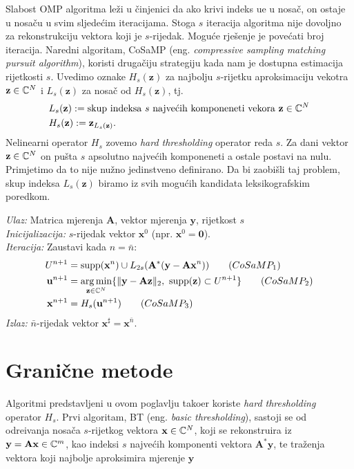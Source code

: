 \documentclass[a4paper,twoside,12pt]{memoir} %
\newcommand{\vect}[1]{\mathbf{#1}}
\renewcommand{\vec}{\vect}
\newcommand{\supp}{\text{\normalfont{supp}}}
\newcommand{\norm}[1]{\|{#1}\|}
\DeclareMathOperator*{\argmin}{arg\,min}
\newenvironment{alg}[1]
{
    \bigskip
    \begin{tcolorbox}[arc=0mm,boxrule=1.2pt,colframe=black,colback=white,detach title, before upper={\medskip\begin{center}\textbf{#1}\end{center}\hline\newline\medskip},frame hidden]
    \medskip
}
{
    \medskip
\end{tcolorbox}
    \bigskip
}
\begin{document}
\indent
Slabost OMP algoritma le\v{z}i u \v{c}injenici da ako krivi indeks u\dj e u nosa\v{c}, on ostaje u nosa\v{c}u u svim sljede\'cim iteracijama. Stoga $s$ iteracija algoritma nije dovoljno za rekonstrukciju vektora koji je $s$-rijedak. Mogu\'ce rje\v{s}enje je pove\'cati broj iteracija. Naredni algoritam, CoSaMP (eng. \textit{compressive sampling matching pursuit algorithm}), koristi druga\v{c}iju strategiju kada nam je dostupna estimacija rijetkosti $s$. Uvedimo oznake $H_s(\vec z)$ za najbolju $s$-rijetku aproksimaciju vekotra $\vec z \in \C^N$ i $L_s(\vec z)$ za nosa\v{c} od $H_s(\vec z)$, tj.
\begin{align}
    &L_s(\vec z) := \text{skup indeksa $s$ najve\'cih komponeneti vekora } \vec z \in \C^N \\
    &H_s(\vec z) := \vec z_{L_s(\vec z)}.
\end{align}
Nelinearni operator $H_s$ zovemo \textit{hard thresholding} operator reda $s$. Za dani vektor $\vec z \in \C^N$ on pu\v{s}ta $s$ apsolutno najve\'cih komponeneti a ostale postavi na nulu. Primjetimo da to nije nu\v{z}no jedinstveno definirano. Da bi zaobi\v{s}li taj problem, skup indeksa $L_s(\vec z)$ biramo iz svih mogu\'cih kandidata leksikografskim poredkom.

\begin{alg}{CoSaMP}
    \textit{Ulaz:} Matrica mjerenja $\vec A$, vektor mjerenja $\vec y$, rijetkost $s$ \\
    \textit{Inicijalizacija:} $s$-rijedak vektor $\vec x^0$ (npr. $\vec x^0 = \vec 0$).\\
    \textit{Iteracija:} Zaustavi kada $n = \bar{n}$:
        \begin{align*}
            U^{n+1} & = \supp(\vec x^n)\cup L_{2s}(\vec A^*(\vec y - \vec{Ax}^n))  \tag{$CoSaMP_1$}\label{cosamp_1}\\
            \vec u^{n+1} & = \argmin_{\vec z \in \C^N}\{\norm{\vec y - \vec{Az}}_2,\ \supp(\vec z) \subset U^{n+1}\}  \tag{$CoSaMP_2$}\label{cosamp_2}\\
            \vec x^{n+1} & = H_s(\vec u^{n+1})  \tag{$CoSaMP_3$}\label{cosamp_3}
        \end{align*}
        \textit{Izlaz:} $\bar{n}$-rijedak vektor $\vec x^{\sharp}=\vec{x}^{\bar{n}}$.
\end{alg}



\section[Grani\v{c}ne metode][Grani\v{c}ne metode]{Grani\v{c}ne metode}
Algoritmi predstavljeni u ovom poglavlju tako\dj er koriste \textit{hard thresholding} operator $H_s$. Prvi algoritam, BT (eng. \textit{basic thresholding}), sastoji se od odre\dj ivanja nosa\v{c}a $s$-rijetkog vektora $\vec x \in \C^N$, koji se rekonstruira iz $\vec y = \vec{Ax} \in \C^m$, kao indeksi $s$ najve\'cih komponenti vektora $\vec A^* \vec y$, te tra\v{z}enja vektora koji najbolje aproksimira mjerenje $\vec y$
\end{document}
